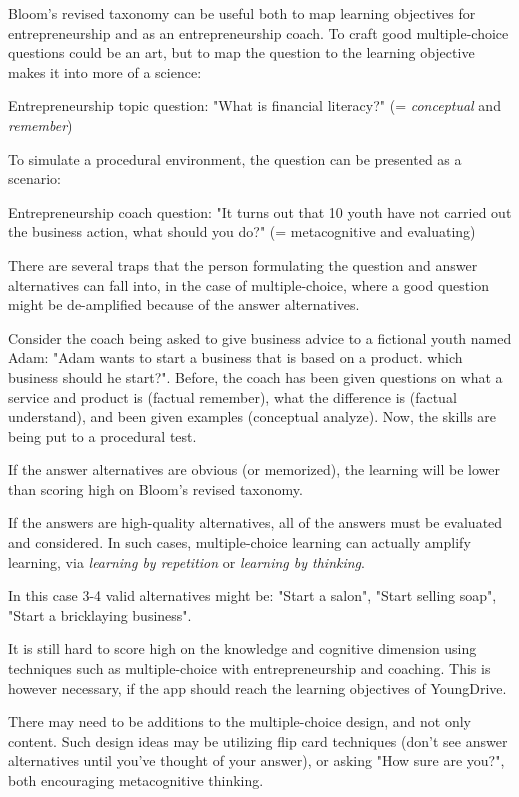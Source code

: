   Bloom's revised taxonomy can be useful both to map learning objectives for entrepreneurship and as an entrepreneurship coach. To craft good multiple-choice questions could be an art, but to map the question to the learning objective makes it into more of a science:

  Entrepreneurship topic question: "What is financial literacy?" (= \textit{conceptual} and \textit{remember})

  To simulate a procedural environment, the question can be presented as a scenario:

  Entrepreneurship coach question: "It turns out that 10 youth have not carried out the business action, what should you do?" (= metacognitive and evaluating)

  There are several traps that the person formulating the question and answer alternatives can fall into, in the case of multiple-choice, where a good question might be de-amplified because of the answer alternatives.

  Consider the coach being asked to give business advice to a fictional youth named Adam: "Adam wants to start a business that is based on a product. which business should he start?". Before, the coach has been given questions on what a service and product is (factual remember), what the difference is (factual understand), and been given examples (conceptual analyze). Now, the skills are being put to a procedural test.

  If the answer alternatives are obvious (or memorized), the learning will be lower than scoring high on Bloom's revised taxonomy.

  If the answers are high-quality alternatives, all of the answers must be evaluated and considered. In such cases, multiple-choice learning can actually amplify learning, via \textit{learning by repetition} or \textit{learning by thinking}.

  In this case 3-4 valid alternatives might be: "Start a salon", "Start selling soap", "Start a bricklaying business".

  It is still hard to score high on the knowledge and cognitive dimension using techniques such as multiple-choice with entrepreneurship and coaching. This is however necessary, if the app should reach the learning objectives of YoungDrive.

  There may need to be additions to the multiple-choice design, and not only content. Such design ideas may be utilizing flip card techniques (don't see answer alternatives until you've thought of your answer), or asking "How sure are you?", both encouraging metacognitive thinking.

